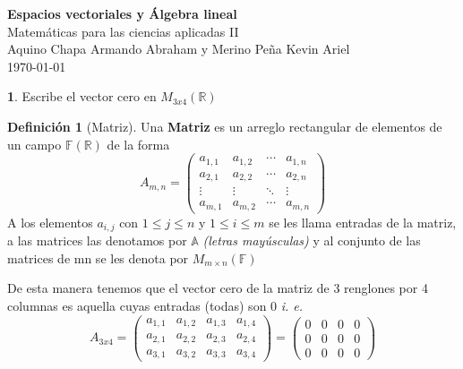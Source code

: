 \documentclass[letterpaper]{article}
\newcommand{\F}{\mathds{F}}
\newcommand{\R}{\mathds{R}}
\renewcommand{\*}{\cdot}
\theoremstyle{definition}
\newtheorem{definition}{Definición}
\begin{document}
		\begin{titlepage}
		\begin{center}
			\Large{\textbf{Espacios vectoriales y Álgebra lineal}} \\[0.1cm]
			\huge{Matemáticas para las ciencias aplicadas II}\\[0.2cm]
			\large{Aquino Chapa Armando Abraham y Merino Peña Kevin Ariel }
			\\
			\today
		\end{center}
		\let\newpage\relax%
		\hrulefill
	\end{titlepage}

	
	\noindent \textbf{1}. Escribe el vector cero en $M_{3x4}(\mathbb{R})$
		\begin{definition}[Matriz]
		Una \textbf{Matriz} es un arreglo rectangular de elementos de un campo $ \F(\R) $ de la forma
		\begin{equation*}
		A_{m,n} = 
		\begin{pmatrix}
		a_{1,1} & a_{1,2} & \cdots & a_{1,n} \\
		a_{2,1} & a_{2,2} & \cdots & a_{2,n} \\
		\vdots  & \vdots  & \ddots & \vdots  \\
		a_{m,1} & a_{m,2} & \cdots & a_{m,n} 
		\end{pmatrix}
		\end{equation*}
		A los elementos $ a_{i,j} $ con $ 1 \leq j \leq n $ y $ 1 \leq i \leq m $ se les llama entradas de la matriz, a las matrices las denotamos por $ \mathds{A} $ 				\textit{(letras mayúsculas)} y al conjunto de las matrices de mn se les denota por $ M_{m\times n}(\F) $
		
	\end{definition}
	De esta manera tenemos que el vector cero de la matriz de 3 renglones por 4 columnas es aquella cuyas entradas (todas) son 0 \textit{i. e. }
		\begin{equation*}
		A_{3x4} = 
		\begin{pmatrix}
		a_{1,1} & a_{1,2} & a_{1,3} & a_{1,4} \\
		a_{2,1} & a_{2,2} & a_{2,3} & a_{2,4} \\
		a_{3,1} & a_{3,2} & a_{3,3} & a_{3,4} 
		\end{pmatrix}
		= 
		\begin{pmatrix}
		0 & 0 & 0 & 0\\
		0 & 0 & 0 & 0 \\
		0 & 0 & 0 & 0
		\end{pmatrix}
		\end{equation*}
		
\end{document}
